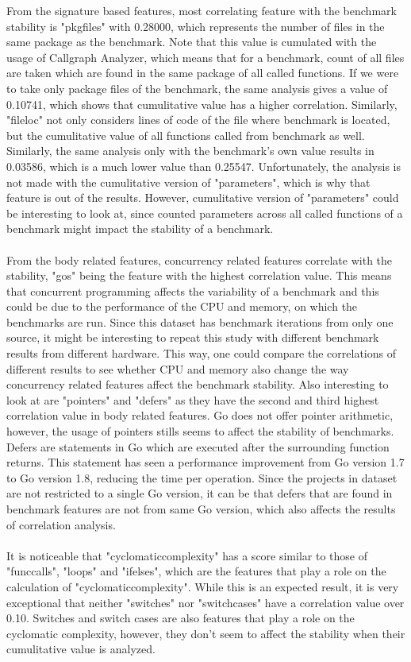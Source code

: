 \documentclass{seal_thesis}
\begin{document}
From the signature based features, most correlating feature with the benchmark stability is "pkgfiles" with 0.28000, which represents the number of files in the same package as the benchmark. Note that this value is cumulated with the usage of Callgraph Analyzer, which means that for a benchmark, count of all files are taken which are found in the same package of all called functions. If we were to take only package files of the benchmark, the same analysis gives a value of 0.10741, which shows that cumulitative value has a higher correlation. Similarly, "fileloc" not only considers lines of code of the file where benchmark is located, but the cumulitative value of all functions called from benchmark as well. Similarly, the same analysis only with the benchmark's own value results in 0.03586, which is a much lower value than 0.25547. Unfortunately, the analysis is not made with the cumulitative version of "parameters", which is why that feature is out of the results. However, cumulitative version of "parameters" could be interesting to look at, since counted parameters across all called functions of a benchmark might impact the stability of a benchmark.\\
\\
From the body related features, concurrency related features correlate with the stability, "gos" being the feature with the highest correlation value. This means that concurrent programming affects the variability of a benchmark and this could be due to the performance of the CPU and memory, on which the benchmarks are run. Since this dataset has benchmark iterations from only one source, it might be interesting to repeat this study with different benchmark results from different hardware. This way, one could compare the correlations of different results to see whether CPU and memory also change the way concurrency related features affect the benchmark stability. Also interesting to look at are "pointers" and "defers" as they have the second and third highest correlation value in body related features. Go does not offer pointer arithmetic, however, the usage of pointers stills seems to affect the stability of benchmarks. Defers are statements in Go which are executed after the surrounding function returns. This statement has seen a performance improvement from Go version 1.7 to Go version 1.8, reducing the time per operation. Since the projects in dataset are not restricted to a single Go version, it can be that defers that are found in benchmark features are not from same Go version, which also affects the results of correlation analysis.\\
\\
It is noticeable that "cyclomaticcomplexity" has a score similar to those of "funccalls", "loops" and "ifelses", which are the features that play a role on the calculation of "cyclomaticcomplexity". While this is an expected result, it is very exceptional that neither "switches" nor "switchcases" have a correlation value over 0.10. Switches and switch cases are also features that play a role on the cyclomatic complexity, however, they don't seem to affect the stability when their cumulitative value is analyzed.
\end{document}
